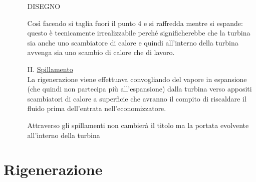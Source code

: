 \begin{adjustwidth}{2in}{}
\begin{enumerate}
\begin{enumerate}
			DISEGNO
			
			Così facendo si taglia fuori il punto 4 e si raffredda mentre si espande: questo è tecnicamente irrealizzabile perché significherebbe che la turbina sia anche uno scambiatore di calore e quindi all'interno della turbina avvenga sia uno scambio di calore che di lavoro. 
			
			\item[II.] \underline{Spillamento}\\
			La rigenerazione viene effettuava convogliando del vapore in espansione (che quindi non partecipa più all'espansione) dalla turbina verso appositi scambiatori di calore a superficie che avranno il compito di riscaldare il fluido prima dell'entrata nell'economizzatore. 
			
			Attraverso gli spillamenti non cambierà il titolo ma la portata evolvente all'interno della turbina
			
		\end{enumerate}
	\end{enumerate}
\end{adjustwidth}


\section{Rigenerazione}

